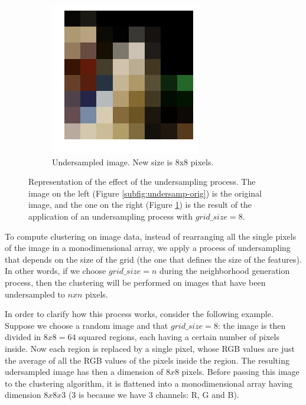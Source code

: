 \documentclass[12pt, twoside, a4paper]{report}
\begin{document}
\begin{figure}
\begin{subfigure}[b]{.465\linewidth}
\includegraphics[width=\linewidth]{images/undersamp-und.png}
\caption{Undersampled image. New size is 8x8 pixels.}
\label{subfig:undersamp-und}
\end{subfigure}
\caption{Representation of the effect of the undersampling process. The image on the left (Figure \ref{subfig:undersamp-orig}) is the original image, and the one on the right (Figure \ref{subfig:undersamp-und}) is the result of the application of an undersampling process with $grid\_size = 8$.}
\label{fig:undersamp-example}
\end{figure}

To compute clustering on image data, instead of rearranging all the single pixels of the image in a monodimensional array, we apply a process of undersampling that depends on the size of the grid (the one that defines the size of the features). In other words, if we choose $grid\_size = n$ during the neighborhood generation process, then the clustering will be performed on images that have been undersampled to $nxn$ pixels.

In order to clarify how this process works, consider the following example. Suppose we choose a random image and that $grid\_size=8$: the image is then divided in $8x8 = 64$ squared regions, each having a certain number of pixels inside. Now each region is replaced by a single pixel, whose RGB values are just the average of all the RGB values of the pixels inside the region. The resulting udersampled image has then a dimension of $8x8$ pixels. Before passing this image to the clustering algorithm, it is flattened into a monodimensional array having dimension $8x8x3$ (3 is because we have 3 channels: R, G and B).
\bigskip
\end{document}
